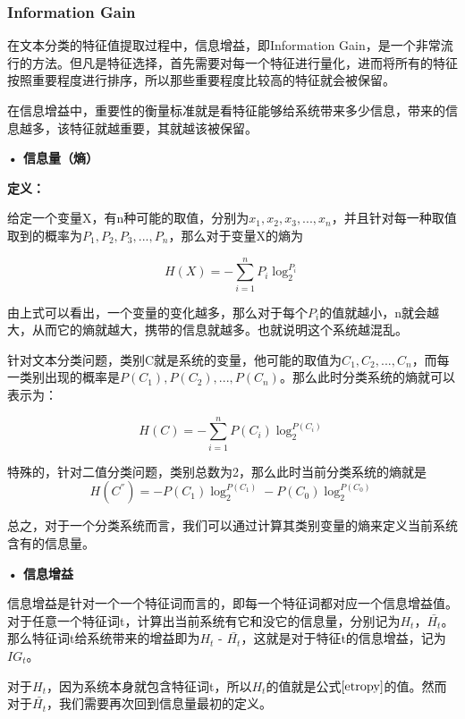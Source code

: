 \documentclass[a4paper,11pt,twoside,openany]{article}
\begin{document}
\begin{CJK*}{UTF8}{gbsn}
\subsubsection{Information Gain}
在文本分类的特征值提取过程中，信息增益，即Information Gain，是一个非常流行的方法。但凡是特征选择，首先需要对每一个特征进行量化，进而将所有的特征按照重要程度进行排序，所以那些重要程度比较高的特征就会被保留。

在信息增益中，重要性的衡量标准就是看特征能够给系统带来多少信息，带来的信息越多，该特征就越重要，其就越该被保留。

\textbf{• 信息量（熵）}


\textbf{定义：}

给定一个变量X，有n种可能的取值，分别为$x_1,x_2,x_3,...,x_n$，并且针对每一种取值取到的概率为$P_1,P_2,P_3,...,P_n$，那么对于变量X的熵为

\begin{equation}
	H(X) = - \sum_{i=1}^n P_i\log_2^{P_i}
\end{equation}

由上式可以看出，一个变量的变化越多，那么对于每个$P_i$的值就越小，n就会越大，从而它的熵就越大，携带的信息就越多。也就说明这个系统越混乱。

针对文本分类问题，类别C就是系统的变量，他可能的取值为$C_1,C_2,...,C_n$，而每一类别出现的概率是$P(C_1),P(C_2),...,P(C_n)$。那么此时分类系统的熵就可以表示为：

\begin{equation}\label{etropy}
	H(C) = - \sum_{i=1}^n P(C_i)\log_2^{P(C_i)}
\end{equation}

特殊的，针对二值分类问题，类别总数为2，那么此时当前分类系统的熵就是
	\begin{equation}
	H(C^{''}) = -P(C_1)\log_2^{P(C_1)}-P(C_0)\log_2^{P(C_0)}
\end{equation}

总之，对于一个分类系统而言，我们可以通过计算其类别变量的熵来定义当前系统含有的信息量。

\textbf{• 信息增益}

信息增益是针对一个一个特征词而言的，即每一个特征词都对应一个信息增益值。对于任意一个特征词t，计算出当前系统有它和没它的信息量，分别记为$H_t$，$\bar{H_t}$。那么特征词t给系统带来的增益即为$H_t$ - $\bar{H_t}$，这就是对于特征t的信息增益，记为 $IG_t$。

对于${H_t}$，因为系统本身就包含特征词t，所以$H_t$的值就是公式$\ref{etropy}$的值。然而对于$\bar{H_t}$，我们需要再次回到信息量最初的定义。


\end{CJK*}
\end{document}
